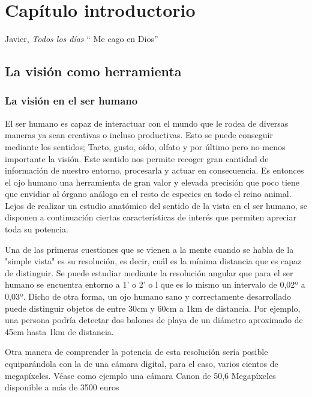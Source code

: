 

\chapter{ Capítulo introductorio}

\begin{chapquote}{Javier, \textit{Todos los días}}
`` Me cago en Dios''
\end{chapquote}

\section{La visión como herramienta}

\subsection{La visión en el ser humano}
El ser humano es capaz de interactuar con el mundo que le rodea de diversas maneras ya sean creativas o incluso productivas. Esto se puede conseguir mediante los sentidos; Tacto, gusto, oído, olfato y por último pero no menos importante la visión. Este sentido nos permite recoger gran cantidad de información de nuestro entorno, procesarla y actuar en consecuencia. Es entonces el ojo humano una herramienta de gran valor y elevada precisión que poco tiene que envidiar al órgano análogo en el resto de especies en todo el reino animal. 
Lejos de realizar un estudio anatómico del sentido de la vista en el ser humano, se disponen a continuación ciertas características de interés que permiten apreciar toda su potencia.

Una de las primeras cuestiones que se vienen a la mente cuando se habla de la "simple vista" es su resolución, es decir, cuál es la mínima distancia que es capaz de distinguir. Se puede estudiar mediante la resolución angular que para el ser humano se encuentra entorno a 1' o 2' o l que es lo mismo un intervalo de 0,02º a 0,03º. Dicho de otra forma, un ojo humano sano y correctamente desarrollado puede distinguir objetos de entre 30cm y 60cm a 1km de distancia. Por ejemplo, una persona podría detectar dos balones de playa de un diámetro aproximado de 45cm hasta 1km de distancia.

Otra manera de comprender la potencia de esta resolución sería posible equiparándola con la de una cámara digital, para el caso, varios cientos de megapíxeles. Véase como ejemplo una cámara Canon de 50,6 Megapíxeles disponible a más de 3500 euros


